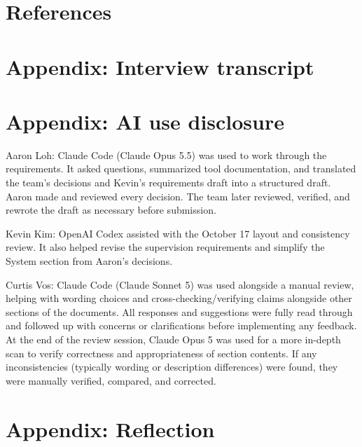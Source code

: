 \documentclass{scrreprt}
\theoremstyle{definition}
\begin{document}
\chapter*{References}

\renewcommand{\bibsection}{}




\chapter*{Appendix: Interview transcript}
\label{app:interview}



\chapter*{Appendix: AI use disclosure}

Aaron Loh: Claude Code (Claude Opus 5.5) was used to work through the requirements. It asked questions, summarized tool documentation, and translated the team's decisions and Kevin's requirements draft into a structured draft. Aaron made and reviewed every decision. The team later reviewed, verified, and rewrote the draft as necessary before submission.

Kevin Kim: OpenAI Codex assisted with the October 17 layout and consistency review. It also helped revise the supervision requirements and simplify the System section from Aaron's decisions.

Curtis Vos: Claude Code (Claude Sonnet 5) was used alongside a manual review, helping with wording choices 
and cross-checking/verifying claims alongside other sections of the documents. All responses and suggestions were fully read through and followed up
with concerns or clarifications before implementing any feedback. At the end of the review session, Claude Opus 5 was used for a more in-depth scan to 
verify correctness and appropriateness of section contents. If any inconsistencies (typically wording or description differences) were found, they were manually verified, compared, and corrected.

\chapter*{Appendix: Reflection}






\end{document}
